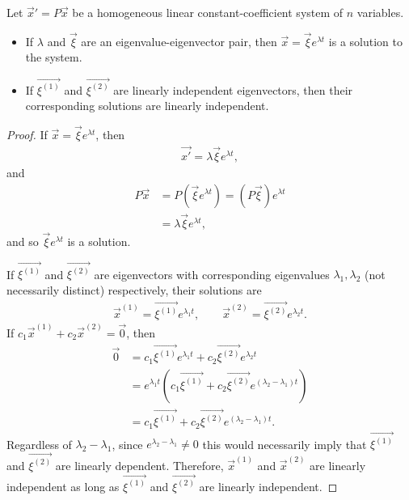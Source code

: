 \begin{thm}
    Let $\vec{x}' = P\vec{x}$ be a homogeneous linear constant-coefficient system of $n$ variables.
    \begin{itemize}
        \item If $\lambda$ and $\vec{\xi}$ are an eigenvalue-eigenvector pair, then $\vec{x} = \vec{\xi}e^{\lambda t}$ is a solution to the system.
        \item If $\vec{\xi^{(1)}}$ and $\vec{\xi^{(2)}}$ are linearly independent eigenvectors, then their corresponding solutions are linearly independent.
    \end{itemize}
\end{thm}

\begin{proof}
    If $\vec{x} = \vec{\xi}e^{\lambda t}$, then
    \begin{align*}
        \vec{x'} = \lambda\vec{\xi}e^{\lambda t},
    \end{align*}
    and
    \begin{align*}
        P\vec{x} &= P\left(\vec{\xi}e^{\lambda t}\right) = \left(P\vec{\xi}\right)e^{\lambda t} \\
        &= \lambda\vec{\xi}e^{\lambda t},
    \end{align*}
    and so $\vec{\xi}e^{\lambda t}$ is a solution.

    If $\vec{\xi^{(1)}}$ and $\vec{\xi^{(2)}}$ are eigenvectors with corresponding eigenvalues $\lambda_1, \lambda_2$ (not necessarily distinct) respectively, their solutions are
    \begin{align*}
        \vec{x}^{(1)} = \vec{\xi^{(1)}}e^{\lambda_1 t}, \quad\quad \vec{x}^{(2)} = \vec{\xi^{(2)}}e^{\lambda_2 t}.
    \end{align*}
    If $c_1\vec{x}^{(1)} + c_2\vec{x}^{(2)} = \vec{0}$, then
    \begin{align*}
        \vec{0} &= c_1\vec{\xi^{(1)}}e^{\lambda_1 t} + c_2\vec{\xi^{(2)}}e^{\lambda_2 t} \\
        &= e^{\lambda_1 t}\left(c_1\vec{\xi^{(1)}} + c_2\vec{\xi^{(2)}}e^{(\lambda_2 - \lambda_1) t}\right) \\
        &= c_1\vec{\xi^{(1)}} + c_2\vec{\xi^{(2)}}e^{(\lambda_2 - \lambda_1) t}.
    \end{align*}
    Regardless of $\lambda_2 - \lambda_1$, since $e^{\lambda_2 - \lambda_1} \neq 0$ this would necessarily imply that $\vec{\xi^{(1)}}$ and $\vec{\xi^{(2)}}$ are linearly dependent. Therefore, $\vec{x}^{(1)}$ and $\vec{x}^{(2)}$ are linearly independent as long as $\vec{\xi^{(1)}}$ and $\vec{\xi^{(2)}}$ are linearly independent.
\end{proof}


